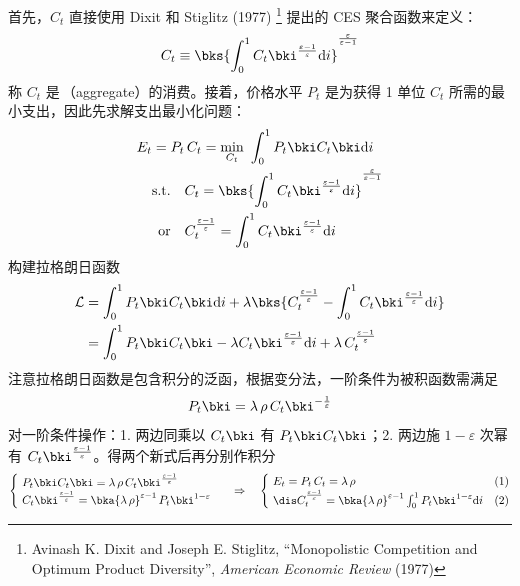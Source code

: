 首先，\(C_t\) 直接使用 Dixit 和 Stiglitz (1977) \footnote{Avinash K. Dixit and Joseph E. Stiglitz, ``Monopolistic Competition and Optimum Product Diversity'', \emph{American Economic Review} (1977)} 提出的 CES 聚合函数来定义：
\begin{equation*}
    C_t\equiv\bks{\int^1_0 C_t\bki^{\frac{\varepsilon-1}\varepsilon}\mathrm{d}i}^{\frac\varepsilon{\varepsilon-1}}
\end{equation*}
称 \(C_t\) 是\,（aggregate）的消费。接着，价格水平 \(P_t\) 是为获得 1 单位 \(C_t\) 所需的最小支出，因此先求解支出最小化问题：
\begin{align*}
     E_t =\;&P_t\,C_t= \min_{C_t} \ \int^1_0 P_t\bki C_t\bki \mathrm{d}i \\
    \text{s.t.} &\quad C_t=\bks{\int^1_0 C_t\bki^{\frac{\varepsilon-1}\varepsilon}\mathrm{d}i}^{\frac\varepsilon{\varepsilon-1}} \\
    \text{or} & \quad C_t^{\frac{\varepsilon-1}{\varepsilon}}=\int^1_0 C_t\bki^{\frac{\varepsilon-1}\varepsilon}\mathrm{d}i
\end{align*}
构建拉格朗日函数
\begin{align*}
    \cal L &=\int^1_0 P_t\bki C_t\bki\mathrm di+\lambda\bks{C_t^{\frac{\varepsilon-1}\varepsilon}-\int^1_0C_t\bki ^{\frac{\varepsilon-1}\varepsilon}\mathrm di}\\
    &= \int^1_0 P_t\bki C_t\bki-\lambda C_t\bki ^{\frac{\varepsilon-1}\varepsilon}\mathrm di+\lambda\,C_t^{\frac{\varepsilon-1}\varepsilon}
\end{align*}
注意拉格朗日函数是包含积分的泛函，根据变分法，一阶条件为被积函数需满足
\begin{align*}
    P_t\bki=\lambda\,\rho\, C_t\bki ^{-\frac1\varepsilon}
\end{align*}
对一阶条件操作：1. 两边同乘以 \(C_t\bki\) 有 \(P_t\bki C_t\bki\)；2. 两边施 \(1-\varepsilon\) 次幂有 \(C_t\bki^{\frac{\varepsilon-1}\varepsilon}\)。得两个新式后再分别作积分
\begin{equation*}
    \begin{cases}
        \ P_t\bki C_t\bki=\lambda\,\rho\, C_t\bki ^{\frac{\varepsilon-1}\varepsilon}\\
        \ C_t\bki^{\frac{\varepsilon-1}\varepsilon}=\bka{\lambda\,\rho}^{\varepsilon-1}\,P_t\bki^{1-\varepsilon}
    \end{cases} \ \ \Rightarrow\quad
    \begin{cases}
        \ E_t=P_t\,C_t=\lambda\,\rho & (1)\\
        \ \dis C_t^{\frac{\varepsilon-1}\varepsilon}=\bka{\lambda\,\rho}^{\varepsilon-1}\int^1_0 P_t\bki^{1-\varepsilon}\mathrm di & (2)
    \end{cases}
\end{equation*}
